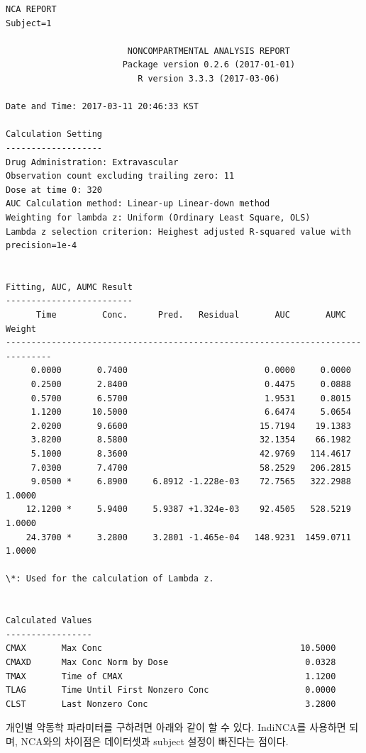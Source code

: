 \documentclass[12pt,]{krantz}
\theoremstyle{definition}
\theoremstyle{definition}
\theoremstyle{definition}
\theoremstyle{remark}
\begin{document}
\begin{verbatim}
NCA REPORT
Subject=1

                        NONCOMPARTMENTAL ANALYSIS REPORT
                       Package version 0.2.6 (2017-01-01)
                          R version 3.3.3 (2017-03-06)

Date and Time: 2017-03-11 20:46:33 KST

Calculation Setting
-------------------
Drug Administration: Extravascular
Observation count excluding trailing zero: 11
Dose at time 0: 320
AUC Calculation method: Linear-up Linear-down method
Weighting for lambda z: Uniform (Ordinary Least Square, OLS)
Lambda z selection criterion: Heighest adjusted R-squared value with precision=1e-4


Fitting, AUC, AUMC Result
-------------------------
      Time         Conc.      Pred.   Residual       AUC       AUMC      Weight
-------------------------------------------------------------------------------
     0.0000       0.7400                           0.0000     0.0000            
     0.2500       2.8400                           0.4475     0.0888            
     0.5700       6.5700                           1.9531     0.8015            
     1.1200      10.5000                           6.6474     5.0654            
     2.0200       9.6600                          15.7194    19.1383            
     3.8200       8.5800                          32.1354    66.1982            
     5.1000       8.3600                          42.9769   114.4617            
     7.0300       7.4700                          58.2529   206.2815            
     9.0500 *     6.8900     6.8912 -1.228e-03    72.7565   322.2988     1.0000
    12.1200 *     5.9400     5.9387 +1.324e-03    92.4505   528.5219     1.0000
    24.3700 *     3.2800     3.2801 -1.465e-04   148.9231  1459.0711     1.0000

\*: Used for the calculation of Lambda z.


Calculated Values
-----------------
CMAX       Max Conc                                       10.5000
CMAXD      Max Conc Norm by Dose                           0.0328
TMAX       Time of CMAX                                    1.1200
TLAG       Time Until First Nonzero Conc                   0.0000
CLST       Last Nonzero Conc                               3.2800
\end{verbatim}

개인별 약동학 파라미터를 구하려면 아래와 같이 할 수 있다. IndiNCA를
사용하면 되며, NCA와의 차이점은 데이터셋과 subject 설정이 빠진다는
점이다.
\end{document}

